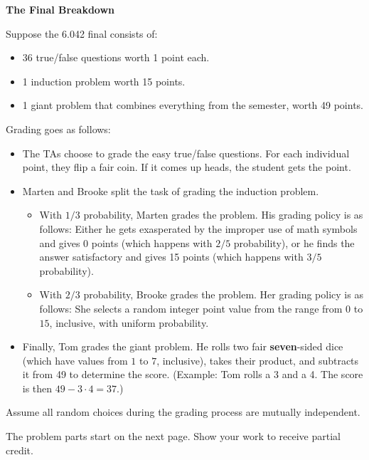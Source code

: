 \documentclass[12pt,oneside]{article}
\newcommand{\ptitle}[1]{\textbf{\hspace{0.2cm}#1}}
\begin{document}
\begin{problem}{25}\label{probability} \ptitle{The Final Breakdown}

Suppose the 6.042 final consists of:

\begin{itemize}
\item 36 true/false questions worth 1 point each.
\item 1 induction problem worth 15 points.
\item 1 giant problem that combines everything from the semester, worth 49 points.
\end{itemize}

Grading goes as follows:
\begin{itemize}
\item The TAs choose to grade the easy true/false questions. For each individual point, they flip a fair coin. If it comes up heads, the student gets the point.

\item Marten and Brooke split the task of grading the induction problem.
\begin{itemize}
\item With $1/3$ probability, Marten grades the problem. His grading policy is as follows: Either he gets exasperated by the improper use of math symbols and gives 0 points (which happens with $2/5$ probability), or he finds the answer satisfactory and gives 15 points (which happens with $3/5$ probability).
\item With $2/3$ probability, Brooke grades the problem. Her grading policy is as follows: She selects a random integer point value from the range from $0$ to $15$, inclusive, with uniform probability.
\end{itemize}

\item Finally, Tom grades the giant problem. He rolls two fair {\bf seven}-sided dice (which have values from $1$ to $7$, inclusive), takes their product, and subtracts it from 49 to determine the score. (Example: Tom rolls a 3 and a 4. The score is then $49 - 3 \cdot 4 = 37$.)

\end{itemize}

Assume all random choices during the grading process are mutually independent. 

The problem parts start on the next page.
Show your work to receive partial credit.


\end{problem}
\end{document}
